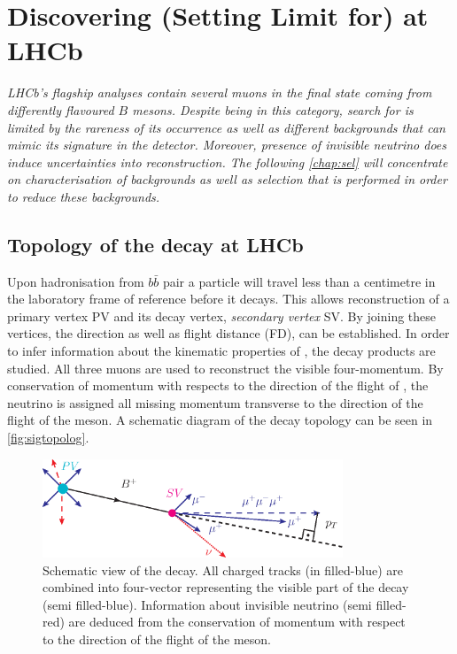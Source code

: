 \chapter{Discovering (Setting Limit for) \Bmumumu at LHCb}
\label{chap:sel}

\textit{LHCb's flagship analyses contain several muons in the final state coming from differently flavoured $B$ mesons. Despite being in this category, search for \Bmumumu is limited by the rareness of its occurrence as well as different backgrounds that can mimic its signature in the detector. Moreover, presence of invisible neutrino does induce uncertainties into reconstruction. The following \autoref{chap:sel} will concentrate on characterisation of backgrounds as well as selection that is performed in order to reduce these backgrounds.}


\section{Topology of the \Bmumumu decay at LHCb}

Upon hadronisation from $b\bar{b}$ pair a \Bpm particle will travel less than a centimetre in the laboratory frame of reference before it decays. This allows reconstruction of a primary vertex \gls{PV} and its decay vertex, \textit{secondary vertex} \gls{SV}. By joining these vertices, the direction as well as flight distance (\gls{FD}), can be established. In order to infer information about the kinematic properties of \Bpm, the decay products are studied. All three muons are used to reconstruct the visible four-momentum. By conservation of momentum with respects to the direction of the flight of \Bpm, the neutrino is assigned all missing momentum transverse to the direction of the flight of the \Bpm meson. A schematic diagram of the decay topology can be seen in \autoref{fig:sigtopolog}.

\begin{figure}[!h]
	\centering
	\includegraphics[width = 0.8\textwidth]{figs/sel/DecReco_fin.eps}
	\caption{Schematic view of the \Bmumumu decay. All charged tracks (in filled-blue) are combined into four-vector representing the visible part of the decay (semi filled-blue). Information about invisible neutrino (semi filled-red) are deduced from the conservation of momentum with respect to the direction of the flight of the \Bpm meson.}%
	\label{fig:sigtopolog}
\end{figure}

